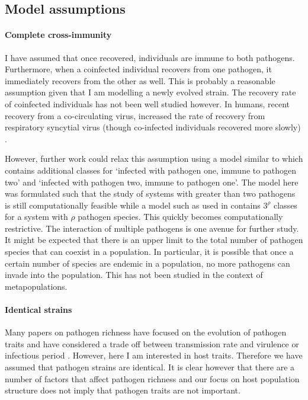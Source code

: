 \subsection{Model assumptions}

\paragraph{Complete cross-immunity}

I have assumed that once recovered, individuals are immune to both pathogens. 
Furthermore, when a coinfected individual recovers from one pathogen, it immediately recovers from the other as well.
This is probably a reasonable assumption given that I am modelling a newly evolved strain.
The recovery rate of coinfected individuals has not been well studied however.
In humans, recent recovery from a co-circulating virus, increased the rate of recovery from respiratory syncytial virus (though co-infected individuals recovered more slowly) \cite{munywoki2015influence}.

However, further work could relax this assumption using a model similar to \cite{poletto2015characterising} which contains additional classes for `infected with pathogen one, immune to pathogen two' and `infected with pathogen two, immune to pathogen one'.
The model here was formulated such that the study of systems with greater than two pathogens is still computationally feasible while a model such as used in \cite{poletto2015characterising} contains $3^\rho$ classes for a system with $\rho$ pathogen species.
This quickly becomes computationally restrictive.
The interaction of multiple pathogens is one avenue for further study.
It might be expected that there is an upper limit to the total number of pathogen species that can coexist in a population.
In particular, it is possible that once a certain number of species are endemic in a population, no more pathogens can invade into the population.
This has not been studied in the context of metapopulations.

\paragraph{Identical strains}

Many papers on pathogen richness have focused on the evolution of pathogen traits and have considered a trade off between transmission rate and virulence \cite{nowak1994superinfection, nowak1994superinfection} or infectious period \cite{poletto2013host}.
However, here I am interested in host traits.
Therefore we have assumed that pathogen strains are identical.
It is clear however that there are a number of factors that affect pathogen richness and our focus on host population structure does not imply that pathogen traits are not important.

